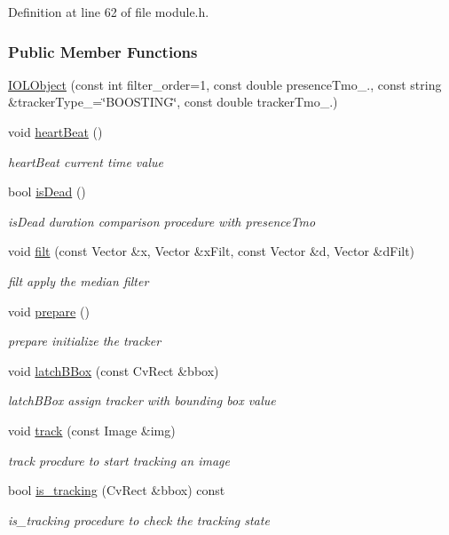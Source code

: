 Definition at line 62 of file module.\+h.

\subsubsection*{Public Member Functions}
\begin{DoxyCompactItemize}
\item 
\hyperlink{group__iol2opc_a4b46d29a6b84e8d9c99225a016fa4fff}{I\+O\+L\+Object} (const int filter\+\_\+order=1, const double presence\+Tmo\+\_., const string \&tracker\+Type\+\_\+=\char`\"{}B\+O\+O\+S\+T\+I\+NG\char`\"{}, const double tracker\+Tmo\+\_.)
\item 
void \hyperlink{group__iol2opc_a96aa95797fec5352039d6699241b6a48}{heart\+Beat} ()
\begin{DoxyCompactList}\small\item\em heart\+Beat current time value \end{DoxyCompactList}\item 
bool \hyperlink{group__iol2opc_a60d0fd467e4f4ab3b4aebed4100e5f21}{is\+Dead} ()
\begin{DoxyCompactList}\small\item\em is\+Dead duration comparison procedure with presence\+Tmo \end{DoxyCompactList}\item 
void \hyperlink{group__iol2opc_a04a024674f0499d660dfe683dca81bd3}{filt} (const Vector \&x, Vector \&x\+Filt, const Vector \&d, Vector \&d\+Filt)
\begin{DoxyCompactList}\small\item\em filt apply the median filter \end{DoxyCompactList}\item 
void \hyperlink{group__iol2opc_a6122efa684bdf4ff7b8bd53ec5db93c9}{prepare} ()
\begin{DoxyCompactList}\small\item\em prepare initialize the tracker \end{DoxyCompactList}\item 
void \hyperlink{group__iol2opc_a9d0702dd5fdcd2a98a5463ddae96c35a}{latch\+B\+Box} (const Cv\+Rect \&bbox)
\begin{DoxyCompactList}\small\item\em latch\+B\+Box assign tracker with bounding box value \end{DoxyCompactList}\item 
void \hyperlink{group__iol2opc_ab113f55006c7a92a7b919d59ac6b94df}{track} (const Image \&img)
\begin{DoxyCompactList}\small\item\em track procdure to start tracking an image \end{DoxyCompactList}\item 
bool \hyperlink{group__iol2opc_a0b5e86163956a37881bf96a0ae7ec067}{is\+\_\+tracking} (Cv\+Rect \&bbox) const
\begin{DoxyCompactList}\small\item\em is\+\_\+tracking procedure to check the tracking state \end{DoxyCompactList}\end{DoxyCompactItemize}
